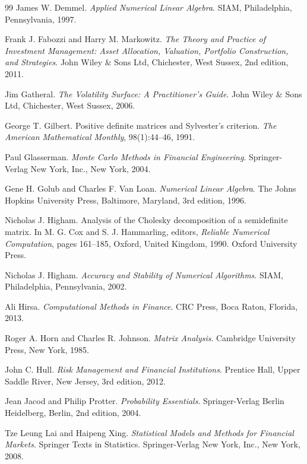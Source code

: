 \begin{thebibliography}{99}
 James W. Demmel. \textit{Applied Numerical Linear Algebra}.
SIAM, Philadelphia, Pennsylvania, 1997.

 Frank J. Fabozzi and Harry M. Markowitz. \textit{The Theory
and Practice of Investment Management: Asset Allocation, Valuation,
Portfolio Construction, and Strategies}. John Wiley \& Sons Ltd,
Chichester, West Sussex, 2nd edition, 2011.

 Jim Gatheral. \textit{The Volatility Surface: A
Practitioner's Guide}. John Wiley \& Sons Ltd, Chichester, West Sussex,
2006.

 George T. Gilbert. Positive definite matrices and Sylvester's
criterion. \textit{The American Mathematical Monthly}, 98(1):44--46, 1991.

 Paul Glasserman. \textit{Monte Carlo Methods in Financial
Engineering}. Springer-Verlag New York, Inc., New York, 2004.

 Gene H. Golub and Charles F. Van Loan. \textit{Numerical
Linear Algebra}. The Johns Hopkins University Press, Baltimore, Maryland,
3rd edition, 1996.

 Nicholas J. Higham. Analysis of the Cholesky decomposition of
a semidefinite matrix. In M. G. Cox and S. J. Hammarling, editors,
\textit{Reliable Numerical Computation}, pages 161--185, Oxford, United
Kingdom, 1990. Oxford University Press.

 Nicholas J. Higham. \textit{Accuracy and Stability of
Numerical Algorithms}. SIAM, Philadelphia, Pennsylvania, 2002.

 Ali Hirsa. \textit{Computational Methods in Finance}. CRC
Press, Boca Raton, Florida, 2013.

 Roger A. Horn and Charles R. Johnson. \textit{Matrix
Analysis}. Cambridge University Press, New York, 1985.

 John C. Hull. \textit{Risk Management and Financial
Institutions}. Prentice Hall, Upper Saddle River, New Jersey, 3rd edition,
2012.

 Jean Jacod and Philip Protter. \textit{Probability
Essentials}. Springer-Verlag Berlin Heidelberg, Berlin, 2nd edition, 2004.

 Tze Leung Lai and Haipeng Xing. \textit{Statistical Models
and Methods for Financial Markets}. Springer Texts in Statistics.
Springer-Verlag New York, Inc., New York, 2008.


\end{thebibliography}
